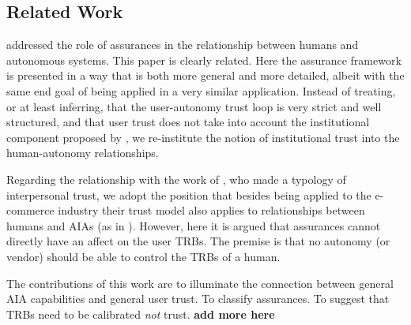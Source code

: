     

\subsection{Related Work}
    \citet{Lillard2016-yg} addressed the role of assurances in the relationship between humans and autonomous systems. This paper is clearly related. Here the assurance framework is presented in a way that is both more general and more detailed, albeit with the same end goal of being applied in a very similar application. Instead of treating, or at least inferring, that the user-autonomy trust loop is very strict and well structured, and that user trust does not take into account the institutional component proposed by \citet{McKnight2001-fa}, we re-institute the notion of institutional trust into the human-autonomy relationships.

    Regarding the relationship with the work of \citet{McKnight2001-fa}, who made a typology of interpersonal trust,  we adopt the position that besides being applied to the e-commerce industry their trust model also applies to relationships between humans and AIAs (as in \citet{Lillard2016-yg}). However, here it is argued that assurances cannot directly have an affect on the user TRBs. The premise is that no autonomy (or vendor) should be able to control the TRBs of a human.

    The contributions of this work are to illuminate the connection between general AIA capabilities and general user trust. To classify assurances. To suggest that TRBs need to be calibrated \emph{not} trust. \textbf{add more here}






